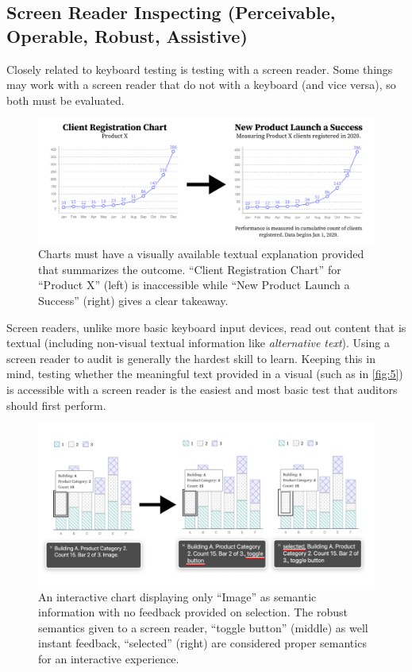\documentclass{egpubl}
\begin{document}
\subsection{Screen Reader Inspecting (Perceivable, Operable, Robust, Assistive) }
Closely related to keyboard testing is testing with a screen reader. Some things may work with a screen reader that do not with a keyboard (and vice versa), so both must be evaluated.

\begin{figure}
    \centering
    \includegraphics[width=\linewidth]{figures/figure 5.png}
    \caption{Charts must have a visually available textual explanation provided that summarizes the outcome. ``Client Registration Chart'' for ``Product X'' (left) is inaccessible while ``New Product Launch a Success'' (right) gives a clear takeaway.}
    \label{fig:5}
\end{figure}

Screen readers, unlike more basic keyboard input devices, read out content that is textual (including non-visual textual information like \emph{alternative text}). Using a screen reader to audit is generally the hardest skill to learn. Keeping this in mind, testing whether the meaningful text provided in a visual (such as in \autoref{fig:5}) is accessible with a screen reader is the easiest and most basic test that auditors should first perform.

\begin{figure}
    \centering
    \includegraphics[width=\linewidth]{figures/figure 6.png}
    \caption{An interactive chart displaying only ``Image'' as semantic information with no feedback provided on selection. The robust semantics given to a screen reader, ``toggle button'' (middle) as well instant feedback, ``selected'' (right) are considered proper semantics for an interactive experience.}
    \label{fig:6}
\end{figure}
\end{document}
